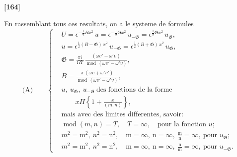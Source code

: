\documentclass[11pt,a4paper]{article}
\DeclareMathOperator{\modd}{mod}
\begin{document}
\textbf{[164]}

En rassemblant tous ces resultats, on a le systeme de formules
\begin{equation*}
\text{(A)}\qquad
\left\{
\begin{aligned}
&U = \epsilon^{-\frac{1}{2}Bx^2}\, u = \epsilon^{-\frac{1}{2}\mathfrak{G}x^2}\, u_{-\mathfrak{G}} = \epsilon^{\frac{1}{2}\mathfrak{G}x^2}\, u_{\mathfrak{G}},\\
&u = \epsilon^{\frac{1}{2}(B-\mathfrak{G})\, x^2}\, u_{-\mathfrak{G}} = \epsilon^{\frac{1}{2}(B+\mathfrak{G})\, x^2}\, u_{\mathfrak{G}},\\
&\mathfrak{G} = \frac{\pi i}{\Omega\Upsilon}\, \frac{(\omega\upsilon' - \omega'\upsilon)}{\modd\, (\omega\upsilon' - \omega'\upsilon)},\\
&B = \frac{\pi\, (\omega\upsilon + \omega'\upsilon')}{\modd\, (\omega\upsilon' - \omega'\upsilon)},\\
&u,\ u_{\mathfrak{G}},\ u_{-\mathfrak{G}}\ \text{des fonctions de la forme}\\
&\qquad x\Pi \left\{1 + \frac{x}{(m, n)}\right\},\\
&\text{mais avec des limites differentes, savoir:}\\
&\modd(m, n) = T,\quad T = \infty,\quad \text{pour la fonction $u$};\\
&m^2 = \mathrm{m}^2,\ n^2 = \mathrm{n}^2,\quad \mathrm{m} = \infty,\ \mathrm{n} = \infty,\ \frac{\mathrm{m}}{\mathrm{n}} = \infty,\ \text{pour $u_{\mathfrak{G}}$};\\
&m^2 = \mathrm{m}^2,\ n^2 = \mathrm{n}^2,\quad \mathrm{m} = \infty,\ \mathrm{n} = \infty,\ \frac{\mathrm{n}}{\mathrm{m}} = \infty,\ \text{pour $u_{-\mathfrak{G}}$.}
\end{aligned}
\right.
\end{equation*}
\end{document}
